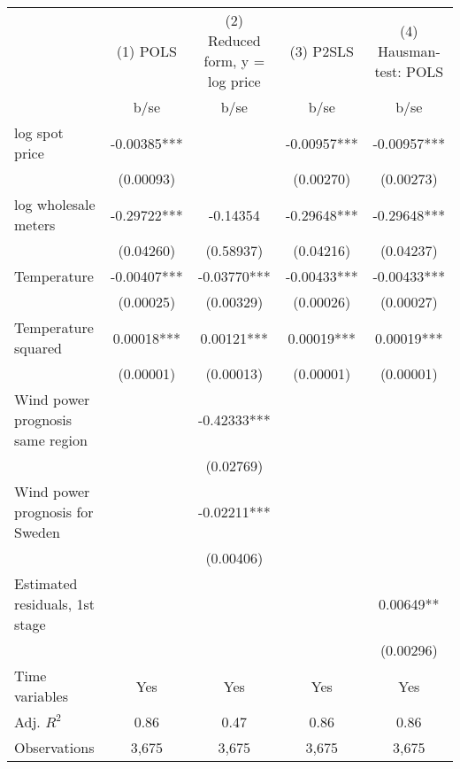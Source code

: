 \begin{tabular}{lcccc}\toprule
                    &    (1) POLS   &(2) Reduced form, y = log price   &   (3) P2SLS   &(4) Hausman-test: POLS   \\
                    &        b/se   &        b/se   &        b/se   &        b/se   \\
\midrule
log spot price      &    -0.00385***&               &    -0.00957***&    -0.00957***\\
                    &   (0.00093)   &               &   (0.00270)   &   (0.00273)   \\
log wholesale meters&    -0.29722***&    -0.14354   &    -0.29648***&    -0.29648***\\
                    &   (0.04260)   &   (0.58937)   &   (0.04216)   &   (0.04237)   \\
Temperature         &    -0.00407***&    -0.03770***&    -0.00433***&    -0.00433***\\
                    &   (0.00025)   &   (0.00329)   &   (0.00026)   &   (0.00027)   \\
Temperature squared &     0.00018***&     0.00121***&     0.00019***&     0.00019***\\
                    &   (0.00001)   &   (0.00013)   &   (0.00001)   &   (0.00001)   \\
Wind power prognosis same region&               &    -0.42333***&               &               \\
                    &               &   (0.02769)   &               &               \\
Wind power prognosis for Sweden&               &    -0.02211***&               &               \\
                    &               &   (0.00406)   &               &               \\
Estimated residuals, 1st stage&               &               &               &     0.00649** \\
                    &               &               &               &   (0.00296)   \\
Time variables      &         Yes   &         Yes   &         Yes   &         Yes   \\
\midrule
Adj. \(R^2\)        &        0.86   &        0.47   &        0.86   &        0.86   \\
Observations        &       3,675   &       3,675   &       3,675   &       3,675   \\
\bottomrule\end{tabular}
